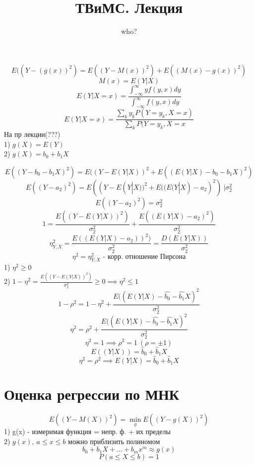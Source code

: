 \documentclass[a4paper]{article}
\begin{document}
\title{ТВиМС. Лекция}
\author{who?}
\maketitle

\begin{equation}
    E((Y - (g(x))^2) = E((Y - M(x))^2) + E((M(x) - g(x))^2)
\end{equation}
\[
    M(x) = E(Y|X)
\]
\[
    E(Y|X=x) = \frac{\int_{-\infty}^{\infty} yf(y,x)dy}{\int_{-\infty}^{\infty} 
    f(y,x)dy} 
\]
\[
    E(Y|X=x) = \frac{\sum_{k} y_k P(Y=y_k, X = x)}{\sum_{k} P(Y = y_k,
    X = x} 
\]
На пр лекции(???)\\
1) $ g(X) = E(Y) $\\
2) $ g(X) = b_0 + b_1X $ 

\begin{equation}
    E((Y - b_0 - b_1X)^2) = E(( Y - E(Y|X))^2 + E((E(Y|X) - b_0 - b_1X)^2)
\end{equation}
\begin{equation}
    E((Y - a_2)^2) = E((Y- E(Y|X))^2 +E((E(Y|X) - a_2)^2) \ | \sigma_2^2
\end{equation}
\[
    E((Y - a_2)^2) = \sigma_2^2
\]
\[
    1 = \frac{E((Y - E(Y|X))^2)}{\sigma_2^2} + \frac{E((E(Y|X) - a_2)^2)}{\sigma_2^2} 
\]
\[
    \eta_{Y,X}^2 = \frac{E((E(Y|X) - a_2))^2)}{\sigma_2^2} = \frac{D(E(Y|X))}{\sigma_2^2} 
\]
\[
    \eta^2 = \eta^2_{Y,X} \text{ - корр. отношение Пирсона}
\]
1) $ \eta^2 \geq 0 $ \\
2) $ 1 - \eta^2 = \frac{E((Y - E(Y|X))^2)}{\sigma_2^2} \geq 0 \implies \eta^2 \leq 1  $ 
\[
    1 - \rho^2 = 1 - \eta^2 + \frac{E((E(Y|X) - \hat{b_0} - \hat{b_1}X)^2}{\sigma_2^2} 
\]
\[
    \eta^2 = \rho^2 + \frac{E((E(Y|X) - \hat{b_0} - \hat{b_1}X)^2}{\sigma_2^2} 
\]
\[
    \eta^2 = 1 \implies \rho^2 = 1 \ (\rho = \pm 1)
\]
\[
    E((Y|X)) = \hat{b}_0 + \hat{b}_1 X
\]
\[
    \eta^2 = \rho^2 \implies E(Y|X) = \hat{b}_0 + \hat{b}_1 X
\]

\section*{Оценка регрессии по МНК}
\[
    E((Y - M(X))^2)  = \min_g E((Y - g(X))^2)
\]
1) g(x) - измеримая функция = непр. ф. + их пределы\\
2) $ g(x), \ a \leq x \leq b $ можно приблизить полиномом 
\[
    b_0 + b_1X + \dots + b_m x^{m} \approx g(x)
\]
\[
    P(a \leq X \leq b) = 1
\]
\end{document}
